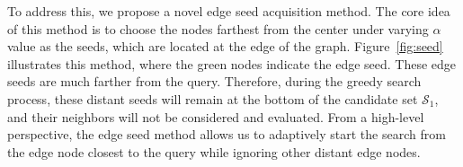 

To address this, we propose a novel edge seed acquisition method. The core idea of this method is to choose the nodes farthest from the center under varying $\alpha$ value as the seeds, which are located at the edge of the graph. Figure~\ref{fig:seed} illustrates this method, where the green nodes indicate the edge seed. These edge seeds are much farther from the query. Therefore, during the greedy search process, these distant seeds will remain at the bottom of the candidate set $\mathcal{S}_1$, and their neighbors will not be considered and evaluated. From a high-level perspective, the edge seed method allows us to adaptively start the search from the edge node closest to the query while ignoring other distant edge nodes.


